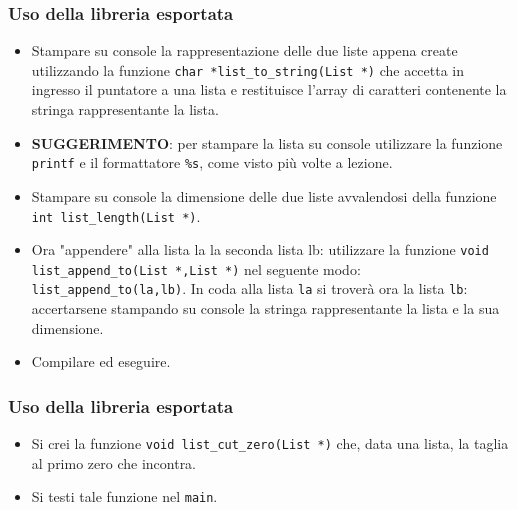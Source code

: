 \documentclass{beamer}
\begin{document}
\begin{frame}[fragile]
\frametitle{Uso della libreria esportata}
\begin{itemize}
 \item Stampare su console la rappresentazione delle due liste appena create utilizzando la funzione \texttt{char *list\_to\_string(List *)} che accetta in ingresso il puntatore a una lista e restituisce l'array di caratteri contenente la stringa rappresentante la lista. \item \textbf{SUGGERIMENTO}: per stampare la lista su console utilizzare la funzione \texttt{printf} e il formattatore \texttt{\%s}, come visto più volte a lezione.
 \item Stampare su console la dimensione delle due liste avvalendosi della funzione \texttt{int list\_length(List *)}.
 \item Ora "appendere" alla lista la la seconda lista lb: utilizzare la funzione \texttt{void list\_append\_to(List *,List *)} nel seguente modo: \texttt{list\_append\_to(la,lb)}. In coda alla lista \texttt{la} si troverà ora la lista \texttt{lb}: accertarsene stampando su console la stringa rappresentante la lista e la sua dimensione.
 \item Compilare ed eseguire.
\end{itemize}
\end{frame}


\begin{frame}[fragile]
\frametitle{Uso della libreria esportata}
\begin{itemize}
 \item Si crei la funzione \texttt{void list\_cut\_zero(List *)} che, data una lista, la taglia al primo zero che incontra.
 \item Si testi tale funzione nel \texttt{main}.
\end{itemize}
\end{frame}
\end{document}
